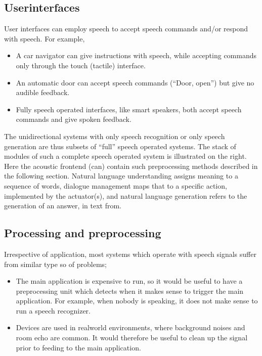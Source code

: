\documentclass[letterpaper,10pt,english]{jupyterBook}
\begin{document}
\subsection{User\sphinxhyphen{}interfaces}
\label{\detokenize{Introduction/Applications_and_systems_structures:user-interfaces}}
\sphinxAtStartPar
User interfaces can employ speech to accept speech commands and/or
respond with speech. For example,
\begin{itemize}
\item {} 
\sphinxAtStartPar
A car navigator can give instructions with speech, while accepting
commands only through the touch (tactile) interface.

\item {} 
\sphinxAtStartPar
An automatic door can accept speech commands (“Door, open”) but give
no audible feedback.

\item {} 
\sphinxAtStartPar
Fully speech operated interfaces, like smart speakers, both accept
speech commands and give spoken feedback.

\end{itemize}

\sphinxAtStartPar
The unidirectional systems with only speech recognition or only speech
generation are thus subsets of “full” speech operated systems. The stack
of modules of such a complete speech operated system is illustrated on
the right. Here the acoustic front\sphinxhyphen{}end (can) contain such pre\sphinxhyphen{}processing
methods described in the following section. Natural language
understanding assigns meaning to a sequence of words, dialogue
management maps that to a specific action, implemented by the
actuator(s), and natural language generation refers to the generation of
an answer, in text from.

\sphinxAtStartPar
{}


\subsection{Processing and preprocessing}
\label{\detokenize{Introduction/Applications_and_systems_structures:processing-and-preprocessing}}
\sphinxAtStartPar
Irrespective of application, most systems which operate with speech
signals suffer from similar type so of problems;
\begin{itemize}
\item {} 
\sphinxAtStartPar
The main application is expensive to run, so it would be useful to
have a pre\sphinxhyphen{}processing unit which detects when it makes sense to
trigger the main application. For example, when nobody is speaking,
it does not make sense to run a speech recognizer.

\item {} 
\sphinxAtStartPar
Devices are used in real\sphinxhyphen{}world environments, where background noises
and room echo are common. It would therefore be useful to clean up
the signal prior to feeding to the main application.

\end{itemize}
\end{document}
